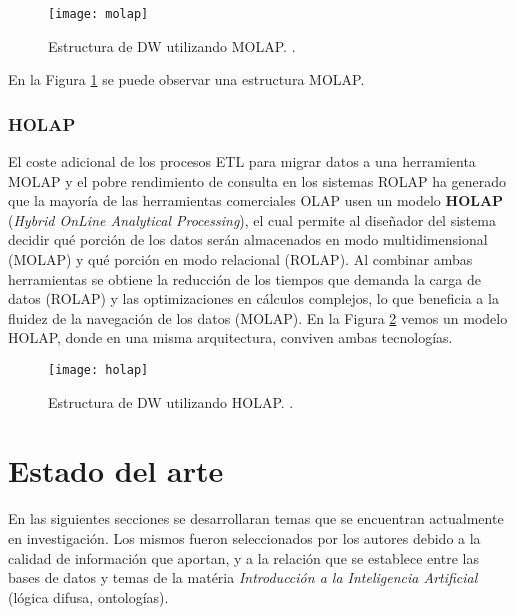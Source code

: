 \documentclass[a4paper,11pt]{article}
\begin{document}
    \begin{figure}
      \begin{center}
        \texttt{[image: molap]}
        \caption{Estructura de DW utilizando MOLAP. \cite[p.~81]{nagabhushana}.}
        \label{molap}
      \end{center}
    \end{figure}
    
    En la Figura \ref{molap} se puede observar una estructura MOLAP.
    
    \subsubsection{HOLAP}

    El coste adicional de los procesos ETL para migrar datos a una herramienta MOLAP y el pobre rendimiento de consulta en los sistemas ROLAP ha generado que la
    mayoría de las herramientas comerciales OLAP usen un modelo \textbf{HOLAP} (\textit{Hybrid OnLine Analytical Processing}), el cual permite al diseñador del sistema
    decidir qué porción de los datos serán almacenados en modo multidimensional (MOLAP) y qué porción en modo relacional (ROLAP). Al combinar ambas herramientas
    se obtiene la reducción de los tiempos que demanda la carga de datos (ROLAP) y las optimizaciones en cálculos complejos, lo que beneficia a la fluidez de la
    navegación de los datos (MOLAP). En la Figura \ref{holap} vemos un modelo HOLAP, donde en una misma arquitectura, conviven ambas tecnologías.
    
    \begin{figure}
      \begin{center}
        \texttt{[image: holap]}
        \caption{Estructura de DW utilizando HOLAP. \cite[p.~82]{nagabhushana}.}
        \label{holap}
      \end{center}
    \end{figure}
    
    
    
    \section{Estado del arte}
    
    En las siguientes secciones se desarrollaran temas que se encuentran actualmente en investigación. Los mismos fueron seleccionados por los autores
    debido a la calidad de información que aportan, y a la relación que se establece entre las bases de datos y temas de la matéria
    \textit{Introducción a la Inteligencia Artificial} (lógica difusa, ontologías).
    
\end{document}
